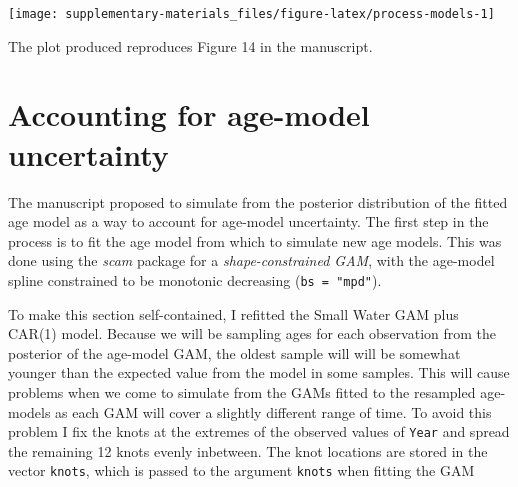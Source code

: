 \documentclass[12pt,]{article}
\newenvironment{Shaded}{\begin{snugshade}}{\end{snugshade}}
\newcommand{\DataTypeTok}[1]{\textcolor[rgb]{0.13,0.29,0.53}{#1}}
\newcommand{\KeywordTok}[1]{\textcolor[rgb]{0.13,0.29,0.53}{\textbf{#1}}}
\newcommand{\NormalTok}[1]{#1}
\newcommand{\OperatorTok}[1]{\textcolor[rgb]{0.81,0.36,0.00}{\textbf{#1}}}
\newcommand{\StringTok}[1]{\textcolor[rgb]{0.31,0.60,0.02}{#1}}
\begin{document}
\begin{Shaded}
\end{Shaded}

\begin{center}\texttt{[image: supplementary-materials\_files/figure-latex/process-models-1]} \end{center}

The plot produced reproduces Figure 14 in the manuscript.

\hypertarget{accounting-for-age-model-uncertainty}{%
\section{Accounting for age-model
uncertainty}\label{accounting-for-age-model-uncertainty}}

The manuscript proposed to simulate from the posterior distribution of
the fitted age model as a way to account for age-model uncertainty. The
first step in the process is to fit the age model from which to simulate
new age models. This was done using the \emph{scam} package for a
\emph{shape-constrained GAM}, with the age-model spline constrained to
be monotonic decreasing (\texttt{bs\ =\ "mpd"}).

To make this section self-contained, I refitted the Small Water GAM plus
CAR(1) model. Because we will be sampling ages for each observation from
the posterior of the age-model GAM, the oldest sample will will be
somewhat younger than the expected value from the model in some samples.
This will cause problems when we come to simulate from the GAMs fitted
to the resampled age-models as each GAM will cover a slightly different
range of time. To avoid this problem I fix the knots at the extremes of
the observed values of \texttt{Year} and spread the remaining 12 knots
evenly inbetween. The knot locations are stored in the vector
\texttt{knots}, which is passed to the argument \texttt{knots} when
fitting the GAM
\end{document}
